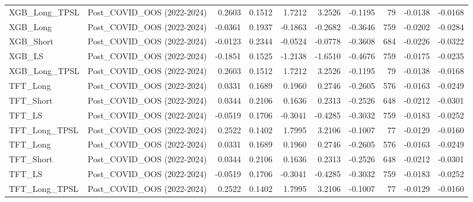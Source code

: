 \begin{tabular}{llrrrrrrrr}
XGB\_Long\_TPSL & Post\_COVID\_OOS (2022-2024) & 0.2603 & 0.1512 & 1.7212 & 3.2526 & -0.1195 & 79 & -0.0138 & -0.0168 \\
\cline{1-10}
XGB\_Long & Post\_COVID\_OOS (2022-2024) & -0.0361 & 0.1937 & -0.1863 & -0.2682 & -0.3646 & 759 & -0.0202 & -0.0284 \\
\cline{1-10}
XGB\_Short & Post\_COVID\_OOS (2022-2024) & -0.0123 & 0.2344 & -0.0524 & -0.0778 & -0.3608 & 684 & -0.0226 & -0.0322 \\
\cline{1-10}
XGB\_LS & Post\_COVID\_OOS (2022-2024) & -0.1851 & 0.1525 & -1.2138 & -1.6510 & -0.4676 & 759 & -0.0175 & -0.0235 \\
\cline{1-10}
XGB\_Long\_TPSL & Post\_COVID\_OOS (2022-2024) & 0.2603 & 0.1512 & 1.7212 & 3.2526 & -0.1195 & 79 & -0.0138 & -0.0168 \\
\cline{1-10}
TFT\_Long & Post\_COVID\_OOS (2022-2024) & 0.0331 & 0.1689 & 0.1960 & 0.2746 & -0.2605 & 576 & -0.0163 & -0.0249 \\
\cline{1-10}
TFT\_Short & Post\_COVID\_OOS (2022-2024) & 0.0344 & 0.2106 & 0.1636 & 0.2313 & -0.2526 & 648 & -0.0212 & -0.0301 \\
\cline{1-10}
TFT\_LS & Post\_COVID\_OOS (2022-2024) & -0.0519 & 0.1706 & -0.3041 & -0.4285 & -0.3032 & 759 & -0.0183 & -0.0252 \\
\cline{1-10}
TFT\_Long\_TPSL & Post\_COVID\_OOS (2022-2024) & 0.2522 & 0.1402 & 1.7995 & 3.2106 & -0.1007 & 77 & -0.0129 & -0.0160 \\
\cline{1-10}
TFT\_Long & Post\_COVID\_OOS (2022-2024) & 0.0331 & 0.1689 & 0.1960 & 0.2746 & -0.2605 & 576 & -0.0163 & -0.0249 \\
\cline{1-10}
TFT\_Short & Post\_COVID\_OOS (2022-2024) & 0.0344 & 0.2106 & 0.1636 & 0.2313 & -0.2526 & 648 & -0.0212 & -0.0301 \\
\cline{1-10}
TFT\_LS & Post\_COVID\_OOS (2022-2024) & -0.0519 & 0.1706 & -0.3041 & -0.4285 & -0.3032 & 759 & -0.0183 & -0.0252 \\
\cline{1-10}
TFT\_Long\_TPSL & Post\_COVID\_OOS (2022-2024) & 0.2522 & 0.1402 & 1.7995 & 3.2106 & -0.1007 & 77 & -0.0129 & -0.0160 \\
\cline{1-10}
\bottomrule
\end{tabular}
